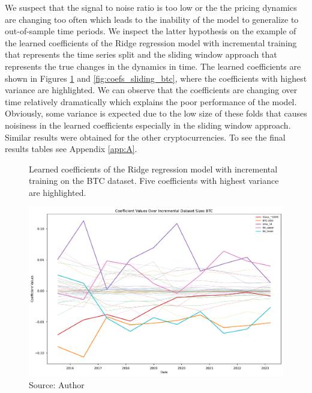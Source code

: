 We suspect that the signal to noise ratio is too low
or the the pricing dynamics are changing too often 
which leads to the inability of the model to generalize
to out-of-sample time periods. We inspect the latter hypothesis
on the example of the learned coefficients of the Ridge regression model
with incremental training that represents
the time series split and the sliding window approach that represents
the true changes in the dynamics in time.
The learned coefficients are shown 
in Figures \ref{fig:coefs_incremental_btc} and \ref{fig:coefs_sliding_btc},
where the coefficients with highest variance are highlighted.
We can observe that the coefficients are changing over time relatively
dramatically which explains the poor performance of the model. Obviously,
some variance is expected due to the low size of these folds
that causes noisiness in the learned coefficients especially in the sliding
window approach. Similar results were obtained for the other cryptocurrencies.
To see the final results tables see Appendix \ref{app:A}.


\begin{figure}[!h]
    \centering
    \caption{Learned coefficients of the Ridge regression model
    with incremental training on the BTC dataset. Five 
    coefficients with highest variance are highlighted.}
    \includegraphics[width=1\textwidth]{Figures/coefficient_values_incremental_btc.pdf}
    \caption*{Source: Author}
    \label{fig:coefs_incremental_btc}
\end{figure}

